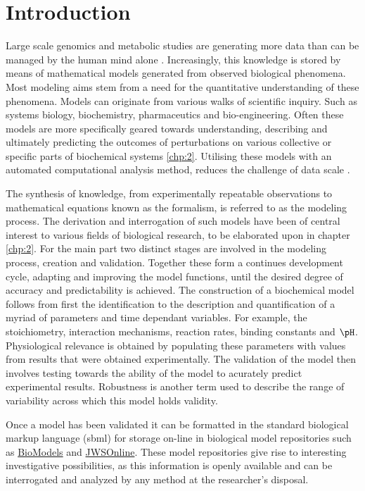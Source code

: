 \chapter{Introduction} \label{chp:1}
Large scale genomics and metabolic studies are generating more data than can be managed by the human mind alone \cite{Khalil2015, Boogerd2007, Kell2006}. Increasingly, this knowledge is stored by means of mathematical models generated from observed biological phenomena. Most modeling aims stem from a need for the quantitative understanding of these phenomena. Models can originate from various walks of scientific inquiry. Such as systems biology, biochemistry, pharmaceutics and bio-engineering. Often these models are more specifically geared towards understanding, describing and ultimately predicting the outcomes of perturbations on various collective or specific parts of biochemical systems \ref{chp:2}. Utilising these models with an automated computational analysis method, reduces the challenge of data scale \cite{Ho2008, Lee2006, Knudsen2004, Bleicher2003, Steuer2003}. 

The synthesis of knowledge, from experimentally repeatable observations to mathematical equations known as the formalism, is referred to as the modeling process. The derivation and interrogation of such models have been of central interest to various fields of biological research, to be elaborated upon in chapter \ref{chp:2}. For the main part two distinct stages are involved in the modeling process, creation and validation. Together these form a continues development cycle, adapting and improving the model functions, until the desired degree of accuracy and predictability is achieved. The construction of a biochemical model follows from first the identification to the description and quantification of a myriad of parameters and time dependant variables. For example, the stoichiometry, interaction mechanisms, reaction rates, binding constants and $\pH$. Physiological relevance is obtained by populating these parameters with values from results that were obtained experimentally. The validation of the model then involves testing towards the ability of the model to acurately predict experimental results. Robustness is another term used to describe the range of variability across which this model holds validity.

Once a model has been validated it can be formatted in the standard biological markup language (\gls{sbml}) for storage on-line in biological model repositories such as \href{https://www.ebi.ac.uk/biomodels-main/}{BioModels} and \href{https://jjj.bio.vu.nl}{JWSOnline}. These model repositories give rise to interesting investigative possibilities, as this information is openly available and can be interrogated and analyzed by any method at the researcher's disposal. 

